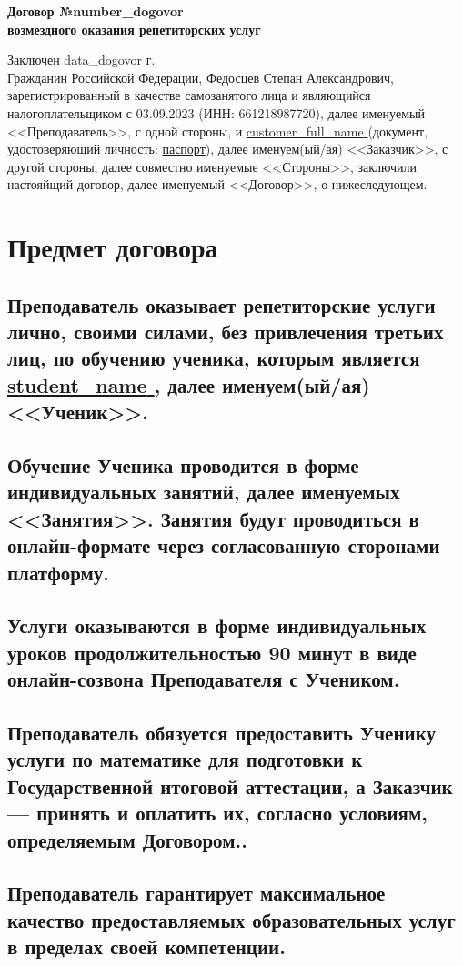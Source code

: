 \documentclass[a4paper,12pt]{article}
\begin{document}
\begin{center}
    \Large{\textbf{Договор №{{number_dogovor}} }} \\
    \large{\textbf{возмездного оказания репетиторских услуг}}
\end{center}
Заключен \hfill {{data_dogovor}} г.\\[0.5cm]
\noindent
Гражданин Российской Федерации, Федосцев Степан Александрович, зарегистрированный в качестве самозанятого лица и являющийся налогоплательщиком с 03.09.2023 (ИНН: 661218987720), далее именуемый <<Преподаватель>>, с одной стороны,
и \underline{ {{customer_full_name}} } (документ, удостоверяющий личность: \underline{паспорт}), \textbf{}далее именуем(ый/ая) <<Заказчик>>, с другой стороны, далее совместно именуемые <<Стороны>>, заключили настояйщий договор, далее именуемый <<Договор>>, о нижеследующем.

\Large{\section{Предмет договора}}
\subsection{Преподаватель оказывает репетиторские услуги лично, своими силами, без привлечения третьих лиц, по обучению ученика, которым является \underline{ {{student_name}} }, далее именуем(ый/ая) <<Ученик>>.}
\subsection{Обучение Ученика проводится в форме индивидуальных занятий, далее именуемых <<Занятия>>. Занятия будут проводиться в онлайн-формате через согласованную сторонами платформу.}
\subsection{Услуги оказываются в форме индивидуальных уроков продолжительностью 90 минут в виде онлайн-созвона Преподавателя с Учеником.}
\subsection{Преподаватель обязуется предоставить Ученику услуги по математике для подготовки к Государственной итоговой аттестации, а Заказчик — принять и оплатить их, согласно условиям, определяемым Договором..}
\subsection{Преподаватель гарантирует максимальное качество предоставляемых образовательных услуг в пределах своей компетенции.}
\end{document}
